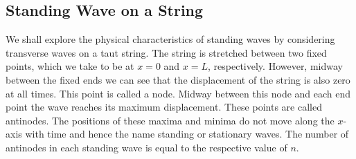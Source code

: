 \documentclass[../../../main.tex]{subfiles}
\begin{document}
\subsection{Standing Wave on a String}
We shall explore the physical characteristics of standing waves by considering transverse waves on a taut string. The string is stretched between two fixed points, which we take to be at $x = 0$ and $x = L$, respectively. However, midway between the fixed ends we can see that the displacement of the string is also zero at all times. This point is called a node. Midway between this node and each end point the wave reaches its maximum displacement. These points are called antinodes. The positions of these maxima and minima do not move along the $x$-axis with time and hence the name standing or stationary waves. The number of antinodes in each standing wave is equal to the respective value of $n$.
\begin{figure}[h]
    \centering
\end{figure}
\end{document}
